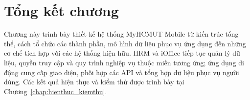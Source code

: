 \section{Tổng kết chương}
\label{sec:tong_ket_chuong_5}

Chương này trình bày thiết kế hệ thống MyHCMUT Mobile từ kiến trúc tổng thể, cách tổ chức các thành phần, mô hình dữ liệu phục vụ ứng dụng đến những cơ chế tích hợp với các hệ thống hiện hữu. HRM và iOffice tiếp tục quản lý dữ liệu, quyền truy cập và quy trình nghiệp vụ thuộc miền tương ứng; ứng dụng di động cung cấp giao diện, phối hợp các API và tổng hợp dữ liệu phục vụ người dùng. Các kết quả hiện thực và kiểm thử được trình bày tại Chương~\ref{chap:hienthuc_kiemthu}.
